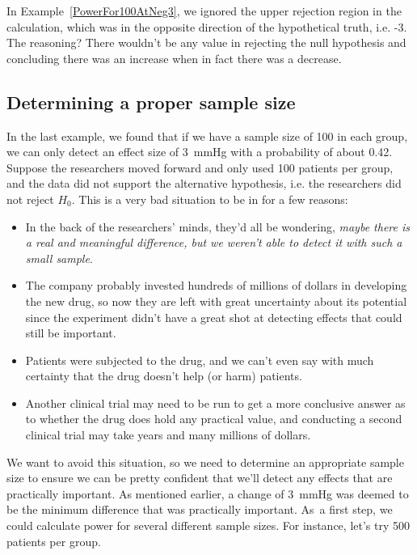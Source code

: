 In Example~\ref{PowerFor100AtNeg3}, we ignored the upper rejection region in the calculation, which was in the opposite direction of the hypothetical truth, i.e. -3. The reasoning? There wouldn't be any value in rejecting the null hypothesis and concluding there was an increase when in fact there was a decrease.



\subsection{Determining a proper sample size}

In the last example, we found that if we have a sample size of 100 in each group, we can only detect an effect size of 3~mmHg with a probability of about 0.42. Suppose the researchers moved forward and only used 100 patients per group, and the data did not support the alternative hypothesis, i.e. the researchers did not reject $H_0$. This is a very bad situation to be in for a few reasons:
\begin{itemize}
\setlength{\itemsep}{0mm}
\item In the back of the researchers' minds, they'd all be wondering, \emph{maybe there is a real and meaningful difference, but we weren't able to detect it with such a small sample}. 
\item The company probably invested hundreds of millions of dollars in developing the new drug, so now they are left with great uncertainty about its potential since the experiment didn't have a great shot at detecting effects that could still be important.
\item Patients were subjected to the drug, and we can't even say with much certainty that the drug doesn't help (or harm) patients.
\item Another clinical trial may need to be run to get a more conclusive answer as to whether the drug does hold any practical value, and conducting a second clinical trial may take years and many millions of dollars.
\end{itemize}
We want to avoid this situation, so we need to determine an appropriate sample size to ensure we can be pretty confident that we'll detect any effects that are practically important. As mentioned earlier, a change of 3~mmHg was deemed to be the minimum difference that was practically important. As~a first step, we could calculate power for several different sample sizes. For instance, let's try 500 patients per group.

